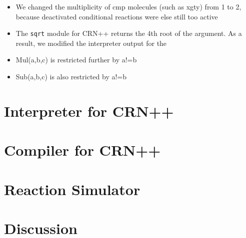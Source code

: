 \documentclass{article}
\begin{document}

\newpage

\tableofcontents


\begin{itemize}
    \item We changed the multiplicity of cmp molecules (such as xgty) from 1 to 2, because deactivated conditional reactions were else still too active
    \item The \texttt{sqrt} module for CRN++ returns the 4th root of the argument. As a result, we modified the interpreter output for the 
    \item Mul(a,b,c) is restricted further by a!=b
    \item Sub(a,b,c) is also restricted by a!=b
\end{itemize}





\section{Interpreter for CRN++} %

\section{Compiler for CRN++}


\section{Reaction Simulator}

\section{Discussion}




\newpage
\printbibliography
\end{document}
